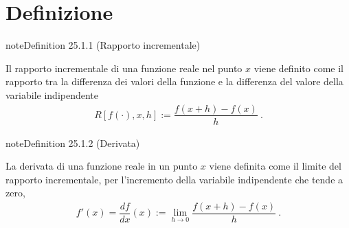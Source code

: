 \documentclass[letterpaper,10pt,italian]{jupyterBook}
\begin{document}
\section{Definizione}
\label{\detokenize{ch/infinitesimal_calculus/derivatives:definizione}}\label{\detokenize{ch/infinitesimal_calculus/derivatives:infinitesimal-calculus-derivatives-def}}\label{ch/infinitesimal_calculus/derivatives:derivatives-incremental-ratio}
\begin{sphinxadmonition}{note}{Definition 25.1.1 (Rapporto incrementale)}



\sphinxAtStartPar
Il rapporto incrementale di una funzione reale nel punto \(x\) viene definito come il rapporto tra la differenza dei valori della funzione e la differenza del valore della variabile indipendente
\begin{equation}\label{equation:ch/infinitesimal_calculus/derivatives:eq:infinitesimal-calculus:derivatives:def_delta}
\begin{split}R[f(\cdot), x, h] := \dfrac{f(x+h)-f(x)}{h} \ .\end{split}
\end{equation}\end{sphinxadmonition}
\label{ch/infinitesimal_calculus/derivatives:derivatives-derivative}
\begin{sphinxadmonition}{note}{Definition 25.1.2 (Derivata)}



\sphinxAtStartPar
La derivata di una funzione reale in un punto \(x\) viene definita come il limite del rapporto incrementale, per l’incremento della variabile indipendente che tende a zero,
\begin{equation}\label{equation:ch/infinitesimal_calculus/derivatives:eq:infinitesimal-calculus:derivatives:def}
\begin{split}f'(x) = \dfrac{d f}{d x}(x) := \lim_{h \rightarrow 0} \dfrac{f(x+h)-f(x)}{h} \ .\end{split}
\end{equation}\end{sphinxadmonition}

\sphinxAtStartPar
{} 
\end{document}
